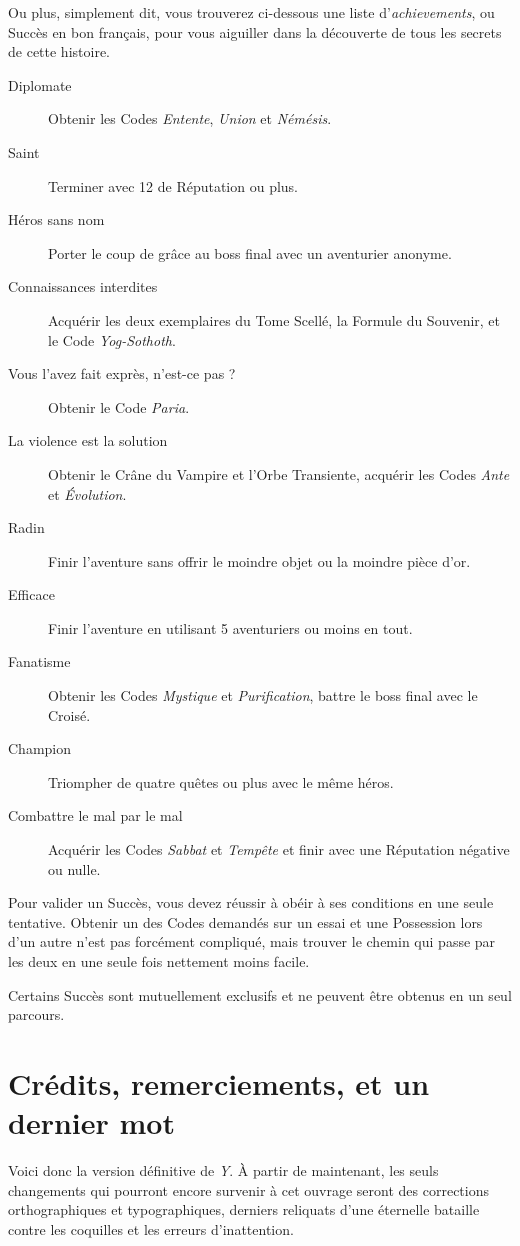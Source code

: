 \documentclass{report}
\begin{document}
Ou plus, simplement dit, vous trouverez ci-dessous une liste d'\emph{achievements}, ou Succès en bon français, pour vous aiguiller dans la découverte de tous les secrets de cette histoire.

\begin{description}
\item[Diplomate] Obtenir les Codes \emph{Entente}, \emph{Union} et \emph{Némésis}.
\item[Saint] Terminer avec 12 de Réputation ou plus.
\item[Héros sans nom] Porter le coup de grâce au boss final avec un aventurier anonyme.
\item[Connaissances interdites] Acquérir les deux exemplaires du Tome Scellé, la Formule du Souvenir, et le Code \emph{Yog-Sothoth}.
\item[Vous l'avez fait exprès, n'est-ce pas ?] Obtenir le Code \emph{Paria}.
\item[La violence est la solution] Obtenir le Crâne du Vampire et l'Orbe Transiente, acquérir les Codes \emph{Ante} et \emph{Évolution}.
\item[Radin] Finir l'aventure sans offrir le moindre objet ou la moindre pièce d'or.
\item[Efficace] Finir l'aventure en utilisant 5 aventuriers ou moins en tout.
\item[Fanatisme] Obtenir les Codes \emph{Mystique} et \emph{Purification}, battre le boss final avec le Croisé.
\item[Champion] Triompher de quatre quêtes ou plus avec le même héros.
\item[Combattre le mal par le mal] Acquérir les Codes \emph{Sabbat} et \emph{Tempête} et finir avec une Réputation négative ou nulle.
\end{description}

Pour valider un Succès, vous devez réussir à obéir à ses conditions en une seule tentative. Obtenir un des Codes demandés sur un essai et une Possession lors d'un autre n'est pas forcément compliqué, mais trouver le chemin qui passe par les deux en une seule fois nettement moins facile.

Certains Succès sont mutuellement exclusifs et ne peuvent être obtenus en un seul parcours.

\chapter{Crédits, remerciements, et un dernier mot}

Voici donc la version définitive de \emph{Y}. À partir de maintenant, les seuls changements qui pourront encore survenir à cet ouvrage seront des corrections orthographiques et typographiques, derniers reliquats d'une éternelle bataille contre les coquilles et les erreurs d'inattention.
\end{document}
